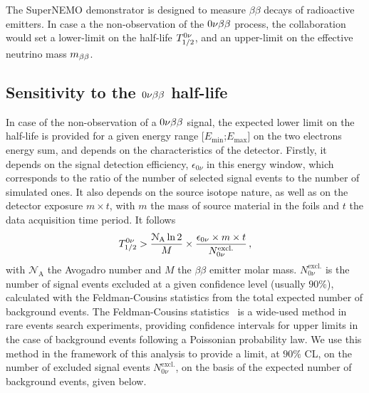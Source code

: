 The SuperNEMO demonstrator is designed to measure $\beta\beta$ decays of radioactive emitters.
In case a the non-observation of the $0\nu\beta\beta$ process, the collaboration would set a lower-limit on the half-life $T_{1/2}^{0\nu}$, and an upper-limit on the effective neutrino mass $m_{\beta\beta}$.

\subsection{Sensitivity to the $0\nu\beta\beta$ half-life}

In case of the non-observation of a $0\nu\beta\beta$ signal, the expected lower limit on the half-life is provided for a given energy range [$E_{\text{min}}$;$E_{\text{max}}$] on the two electrons energy sum, and depends on the characteristics of the detector.
Firstly, it depends on the signal detection efficiency, $\epsilon_{0\nu}$ in this energy window, which corresponds to the ratio of the number of selected signal events to the number of simulated ones.
It also depends on the source isotope nature, as well as on the detector exposure $m\times t$, with $m$ the mass of source material in the foils and $t$ the data acquisition time period.
It follows
\begin{equation}
  T_{1/2}^{0\nu} > \frac{\mathcal{N}_{\text{A}}\ln{2}}{M}\times \frac{\epsilon_{0\nu}\times m\times t}{N_{0\nu}^{\text{excl.}}}\,,
  \label{eq:tbeta_limit}
\end{equation}
with $\mathcal{N}_{\text{A}}$ the Avogadro number and $M$ the $\beta\beta$ emitter molar mass.
$N_{0\nu}^{\text{excl.}}$ is the number of signal events excluded at a given confidence level (usually $90$\%), calculated with the Feldman-Cousins statistics from the total expected number of background events.
The Feldman-Cousins statistics~\cite{art:feld-cous} is a wide-used method in rare events search experiments, providing confidence intervals for upper limits in the case of background events following a Poissonian probability law.
We use this method in the framework of this analysis to provide a limit, at $90\%$ CL, on the number of excluded signal events $N_{0\nu}^{\text{excl.}}$, on the basis of the expected number of background events, given below.

